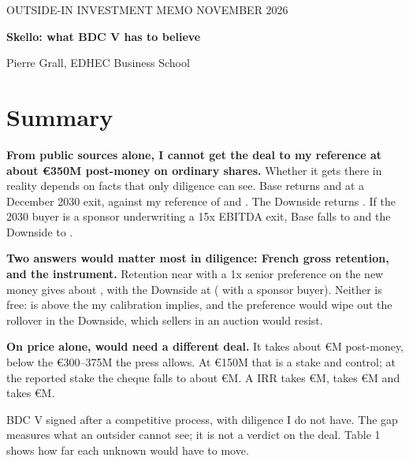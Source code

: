 
\thispagestyle{empty}
{\sans\fontsize{7.8}{10}\selectfont\color{muted}OUTSIDE-IN INVESTMENT MEMO \quad NOVEMBER 2026}\par
\vspace{2pt}
{\sans\bfseries\fontsize{19}{23}\selectfont\color{navy}Skello: what BDC V has to believe}\par
\vspace{1pt}
{\sans\fontsize{8.5}{11}\selectfont Pierre Grall, EDHEC Business School}\par
\vspace{3pt}
\vspace{2pt}

\section*{Summary}
\textbf{From public sources alone, I cannot get the deal to my  reference at about €350M post-money on ordinary shares.} Whether it gets there in reality depends on facts that only diligence can see. Base returns  and  at a December 2030 exit, against my reference of  and . The Downside returns . If the 2030 buyer is a sponsor underwriting a 15x EBITDA exit, Base falls to  and the Downside to .

\textbf{Two answers would matter most in diligence: French gross retention, and the instrument.} Retention near  with a 1x senior preference on the new money gives about , with the Downside at  ( with a sponsor buyer). Neither is free:  is above the  my calibration implies, and the preference would wipe out the rollover in the Downside, which sellers in an auction would resist.

\textbf{On price alone,  would need a different deal.} It takes about €M post-money, below the €300--375M the press allows. At €150M that is a  stake and control; at the reported stake the cheque falls to about €M. A  IRR takes €M,  takes €M and  takes €M.

BDC V signed after a competitive process, with diligence I do not have. The gap measures what an outsider cannot see; it is not a verdict on the deal. Table 1 shows how far each unknown would have to move.

